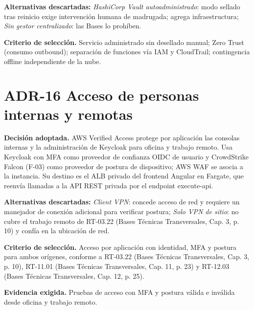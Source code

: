 \textbf{Alternativas descartadas:} \emph{HashiCorp Vault autoadministrado}: modo sellado tras reinicio exige intervención humana de madrugada; agrega infraestructura; \emph{Sin gestor centralizado}: las Bases lo prohíben.

\textbf{Criterio de selección.} Servicio administrado sin desellado manual; Zero Trust (consumo outbound); separación de funciones vía IAM y CloudTrail; contingencia offline independiente de la nube.

\section{ADR-16 \textperiodcentered{} Acceso de personas internas y remotas}
\label{sub:adr-16}

\textbf{Decisión adoptada.} AWS Verified Access protege por aplicación las consolas internas y la administración de Keycloak para oficina y trabajo remoto. Usa Keycloak con MFA como proveedor de confianza OIDC de usuario y CrowdStrike Falcon (F-03) como proveedor de postura de dispositivo; AWS WAF se asocia a la instancia. Su destino es el ALB privado del frontend Angular en Fargate, que reenvía llamadas a la API REST privada por el endpoint execute-api.

\textbf{Alternativas descartadas:} \emph{Client VPN}: concede acceso de red y requiere un manejador de conexión adicional para verificar postura; \emph{Solo VPN de sitio}: no cubre el trabajo remoto de RT-03.22 (Bases Técnicas Transversales, Cap. 3, p. 10) y confía en la ubicación de red.

\textbf{Criterio de selección.} Acceso por aplicación con identidad, MFA y postura para ambos orígenes, conforme a RT-03.22 (Bases Técnicas Transversales, Cap. 3, p. 10), RT-11.01 (Bases Técnicas Transversales, Cap. 11, p. 23) y RT-12.03 (Bases Técnicas Transversales, Cap. 12, p. 25).

\textbf{Evidencia exigida.} Pruebas de acceso con MFA y postura válida e inválida desde oficina y trabajo remoto.
